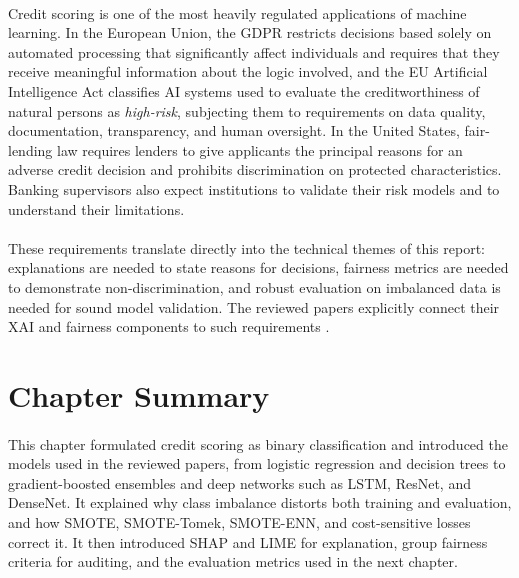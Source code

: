 \documentclass[12pt,a4paper,final]{extreport}
\begin{document}
\paragraph{} Credit scoring is one of the most heavily regulated applications of machine learning. In the European Union, the GDPR restricts decisions based solely on automated processing that significantly affect individuals and requires that they receive meaningful information about the logic involved, and the EU Artificial Intelligence Act classifies AI systems used to evaluate the creditworthiness of natural persons as \emph{high-risk}, subjecting them to requirements on data quality, documentation, transparency, and human oversight. In the United States, fair-lending law requires lenders to give applicants the principal reasons for an adverse credit decision and prohibits discrimination on protected characteristics. Banking supervisors also expect institutions to validate their risk models and to understand their limitations.

\paragraph{} These requirements translate directly into the technical themes of this report: explanations are needed to state reasons for decisions, fairness metrics are needed to demonstrate non-discrimination, and robust evaluation on imbalanced data is needed for sound model validation. The reviewed papers explicitly connect their XAI and fairness components to such requirements \cite{p1,p4}.

\section{Chapter Summary}

\paragraph{} This chapter formulated credit scoring as binary classification and introduced the models used in the reviewed papers, from logistic regression and decision trees to gradient-boosted ensembles and deep networks such as LSTM, ResNet, and DenseNet. It explained why class imbalance distorts both training and evaluation, and how SMOTE, SMOTE-Tomek, SMOTE-ENN, and cost-sensitive losses correct it. It then introduced SHAP and LIME for explanation, group fairness criteria for auditing, and the evaluation metrics used in the next chapter.
\end{document}
